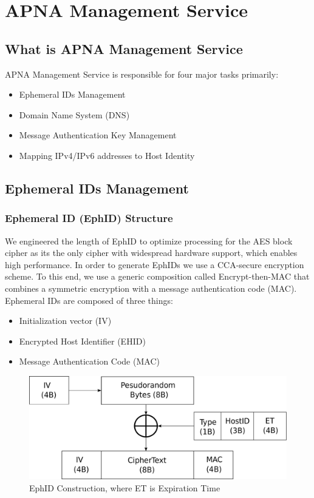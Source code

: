 
\chapter{APNA Management Service} %

\label{apnams} %

\section{What is APNA Management Service}
APNA Management Service is responsible for four major tasks primarily:

\begin{itemize}
    \item Ephemeral IDs Management
    \item Domain Name System (DNS)
    \item Message Authentication Key Management
    \item Mapping IPv4/IPv6 addresses to Host Identity
\end{itemize}

\section{Ephemeral IDs Management}
\subsection{Ephemeral ID (EphID) Structure}
We engineered the length of EphID to optimize processing for the AES block cipher as its the only cipher with widespread hardware support, which enables high performance. In order to generate EphIDs we use a CCA-secure encryption scheme. To this end, we use a generic composition called Encrypt-then-MAC that combines a symmetric encryption with a message authentication code (MAC).
Ephemeral IDs are composed of three things:
\begin{itemize}
    \item Initialization vector (IV)
    \item Encrypted Host Identifier (EHID)
    \item Message Authentication Code (MAC)
\end{itemize}

\begin{figure}[th]
\centering
\includegraphics[scale=0.5]{Figures/ephid_construction.pdf}
\decoRule
\caption[EphID Construction]{EphID Construction, where ET is Expiration Time}
\label{fig:ephid_con}
\end{figure}

